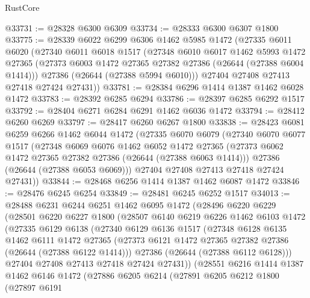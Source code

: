 \begin{lexlean}{RustCore}
\begin{coremodule}
@33731 := @28328 @6300 @6309
@33734 := @28333 @6300 @6307 @1800
@33775 := @28339
    @6022
    @6299
    @6306
    @1462
    @5985
    @1472
    (@27335
      @6011
      @6020
      (@27340
        @6011
        @6018
        @1517
        (@27348
          @6010
          @6017
          @1462
          @5993
          @1472
          @27365
          (@27373 @6003 @1472 @27365 @27382 @27386 (@26644 (@27388 @6004 @1414)))
          @27386
          (@26644 (@27388 @5994 @6010)))
        @27404
        @27408
        @27413
        @27418
        @27424
        @27431))
@33781 := @28384 @6296 @1414 @1387 @1462 @6028 @1472
@33783 := @28392 @6285 @6294
@33786 := @28397 @6285 @6292 @1517
@33792 := @28404 @6271 @6284 @6291 @1462 @6036 @1472
@33794 := @28412 @6260 @6269
@33797 := @28417 @6260 @6267 @1800
@33838 := @28423
    @6081
    @6259
    @6266
    @1462
    @6044
    @1472
    (@27335
      @6070
      @6079
      (@27340
        @6070
        @6077
        @1517
        (@27348
          @6069
          @6076
          @1462
          @6052
          @1472
          @27365
          (@27373 @6062 @1472 @27365 @27382 @27386 (@26644 (@27388 @6063 @1414)))
          @27386
          (@26644 (@27388 @6053 @6069)))
        @27404
        @27408
        @27413
        @27418
        @27424
        @27431))
@33844 := @28468 @6256 @1414 @1387 @1462 @6087 @1472
@33846 := @28476 @6245 @6254
@33849 := @28481 @6245 @6252 @1517
@34013 := @28488
    @6231
    @6244
    @6251
    @1462
    @6095
    @1472
    (@28496
      @6220
      @6229
      (@28501
        @6220
        @6227
        @1800
        (@28507
          @6140
          @6219
          @6226
          @1462
          @6103
          @1472
          (@27335
            @6129
            @6138
            (@27340
              @6129
              @6136
              @1517
              (@27348
                @6128
                @6135
                @1462
                @6111
                @1472
                @27365
                (@27373 @6121 @1472 @27365 @27382 @27386 (@26644 (@27388 @6122 @1414)))
                @27386
                (@26644 (@27388 @6112 @6128)))
              @27404
              @27408
              @27413
              @27418
              @27424
              @27431))
          (@28551
            @6216
            @1414
            @1387
            @1462
            @6146
            @1472
            (@27886
              @6205
              @6214
              (@27891
                @6205
                @6212
                @1800
                (@27897
                  @6191

\end{coremodule}
\end{lexlean}
